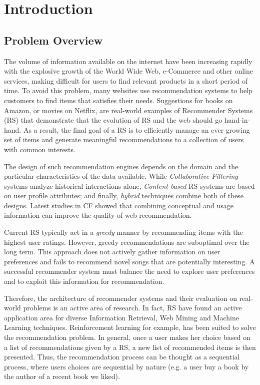 \chapter{Introduction}
\label{chapterlabel1}

\section{Problem Overview}

The volume of information available on the internet have been increasing rapidly with the explosive growth of the World Wide Web, e-Commerce and other online services, making difficult for users to find relevant products in a short period of time. To avoid this problem, many websites use recommendation systems to help customers to find items that satisfies their needs\cite{resnick1997recommender}. Suggestions for books on Amazon, or movies on Netflix, are real-world examples of Recommender Systems (RS) that demonstrate that the evolution of RS and the web should go hand-in-hand. As a result, the final goal of a RS is to efficiently manage an ever growing set of items and generate meaningful recommendations to a collection of users with common interests.

The design of such recommendation engines depends on the domain and the particular characteristics of the data available. While \textit{Collaborative Filtering} systems analyze historical interactions alone, \textit{Content-based} RS systems are based on user profile attributes; and finally, \textit{hybrid} techniques combine both of these designs. Latest studies in CF\cite{bobadilla2013recommender} showed that combining conceptual and usage information can improve the quality of web recommendation.

Current RS typically act in a \textit{greedy} manner by recommending items with the highest user ratings. However, greedy recommendations are suboptimal over the long term. This approach does not actively gather information on user preferences and fails to recommend novel songs that are potentially interesting. A successful recommender system must balance the need to explore user preferences and to exploit this information for recommendation.

Therefore, the architecture of recommender systems and their evaluation on real-world problems is an active area of research. In fact, RS have found an active application area for diverse Information Retrieval, Web Mining and Machine Learning techniques\cite{bobadilla2013recommender}. Reinforcement learning\cite{sutton1998reinforcement} for example, has been suited to solve the recommendation problem. In general, once a user makes her choice based on a list of recommendations given by a RS, a new list of recommended items is then presented. Thus, the recommendation process can be thought as a sequential process, where users choices are sequential by nature (e.g. a user buy a book by the author of a recent book we liked). 

